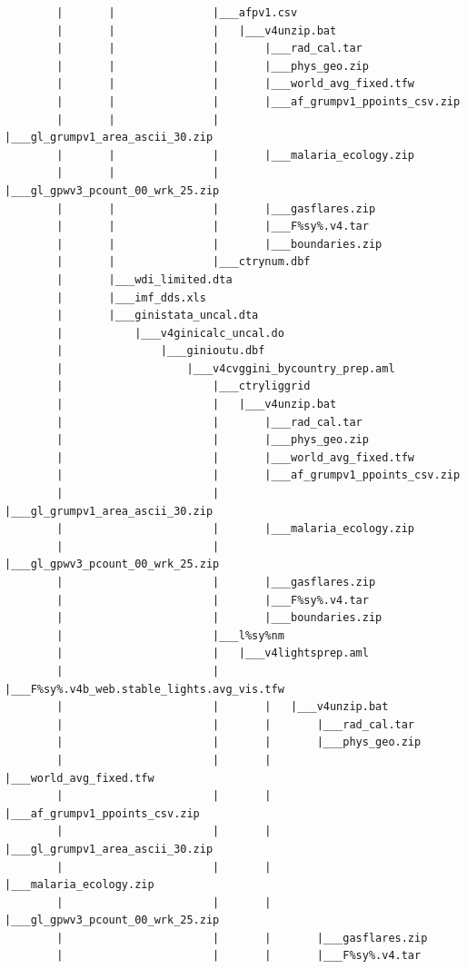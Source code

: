 \documentclass[]{book}
\begin{document}
\begin{verbatim}
        |       |               |___afpv1.csv
        |       |               |   |___v4unzip.bat
        |       |               |       |___rad_cal.tar
        |       |               |       |___phys_geo.zip
        |       |               |       |___world_avg_fixed.tfw
        |       |               |       |___af_grumpv1_ppoints_csv.zip
        |       |               |       |___gl_grumpv1_area_ascii_30.zip
        |       |               |       |___malaria_ecology.zip
        |       |               |       |___gl_gpwv3_pcount_00_wrk_25.zip
        |       |               |       |___gasflares.zip
        |       |               |       |___F%sy%.v4.tar
        |       |               |       |___boundaries.zip
        |       |               |___ctrynum.dbf
        |       |___wdi_limited.dta
        |       |___imf_dds.xls
        |       |___ginistata_uncal.dta
        |           |___v4ginicalc_uncal.do
        |               |___ginioutu.dbf
        |                   |___v4cvggini_bycountry_prep.aml
        |                       |___ctryliggrid
        |                       |   |___v4unzip.bat
        |                       |       |___rad_cal.tar
        |                       |       |___phys_geo.zip
        |                       |       |___world_avg_fixed.tfw
        |                       |       |___af_grumpv1_ppoints_csv.zip
        |                       |       |___gl_grumpv1_area_ascii_30.zip
        |                       |       |___malaria_ecology.zip
        |                       |       |___gl_gpwv3_pcount_00_wrk_25.zip
        |                       |       |___gasflares.zip
        |                       |       |___F%sy%.v4.tar
        |                       |       |___boundaries.zip
        |                       |___l%sy%nm
        |                       |   |___v4lightsprep.aml
        |                       |       |___F%sy%.v4b_web.stable_lights.avg_vis.tfw
        |                       |       |   |___v4unzip.bat
        |                       |       |       |___rad_cal.tar
        |                       |       |       |___phys_geo.zip
        |                       |       |       |___world_avg_fixed.tfw
        |                       |       |       |___af_grumpv1_ppoints_csv.zip
        |                       |       |       |___gl_grumpv1_area_ascii_30.zip
        |                       |       |       |___malaria_ecology.zip
        |                       |       |       |___gl_gpwv3_pcount_00_wrk_25.zip
        |                       |       |       |___gasflares.zip
        |                       |       |       |___F%sy%.v4.tar

\end{verbatim}
\end{document}
